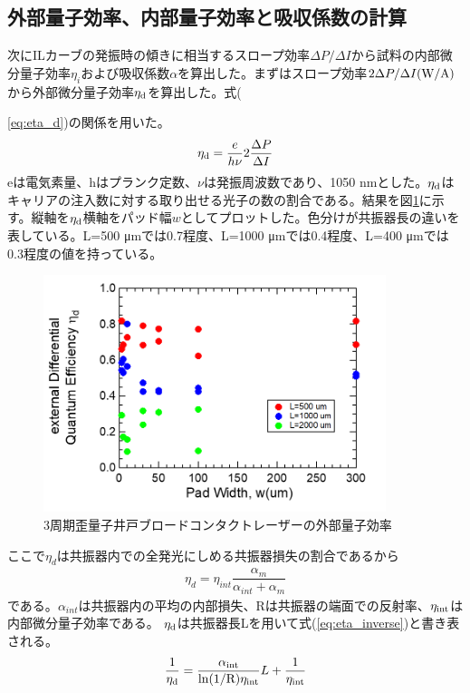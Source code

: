 \subsection{外部量子効率、内部量子効率と吸収係数の計算}%
次にILカーブの発振時の傾きに相当するスロープ効率$\Delta P/\Delta I$から試料の内部微分量子効率$\eta_{i}$および吸収係数$\alpha$を算出した。まずはスロープ効率$2 \Delta P/\Delta I \rm{ (W/A)}$から外部微分量子効率$\eta_{\rm{d}}$を算出した。式({\ref{eq:eta_d})の関係を用いた。
\begin{eqnarray}
\eta_{\rm{d}}=\dfrac{e}{h\nu}2\dfrac{\Delta P}{\Delta I} 
\label{eq:eta_d}
\end{eqnarray}
eは電気素量、hはプランク定数、$\nu$は発振周波数であり、1050 nmとした。$\eta_{\rm{d}}$はキャリアの注入数に対する取り出せる光子の数の割合である。結果を図\ref{fig:fig_3_1_3QW_broadcontact_id}に示す。縦軸を$\eta_{\rm{d}}$横軸をパッド幅$w$としてプロットした。色分けが共振器長の違いを表している。L=500 \si{\micro\metre}では0.7程度、L=1000         \si{\micro\metre}では0.4程度、L=400 \si{\micro\metre}では0.3程度の値を持っている。
\begin{figure}[h]
	\centering
	\includegraphics[width=10cm]{figure/fig_3_1_3QW_broadcontact_id.png}
	\caption{3周期歪量子井戸ブロードコンタクトレーザーの外部量子効率}
	\label{fig:fig_3_1_3QW_broadcontact_id}
\end{figure}

ここで$\eta_{d}$は共振器内での全発光にしめる共振器損失の割合であるから
\begin{eqnarray}
\eta_{d}=\eta_{int}\dfrac{\alpha_{m}}{\alpha_{int} +\alpha_{m}}
\end{eqnarray}
である。$\alpha_{int}$は共振器内の平均の内部損失、Rは共振器の端面での反射率、$\eta_{\rm{int}}$は内部微分量子効率である。
$\eta_{\rm{d}}$は共振器長Lを用いて式(\ref{eq:eta_inverse})と書き表される。
\begin{eqnarray}
\dfrac{1}{\eta_{\rm{d}}}=\dfrac{\alpha_{\rm{int}}}{\rm{ln}(1/R)\eta_{int}}L+\dfrac{1}{\eta_{\rm{int}}}
\label{eq:eta_inverse}
\end{eqnarray}



}
